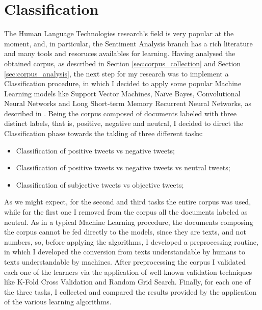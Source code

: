 \documentclass[11pt,twocolumn]{article}
\begin{document}
    \section{Classification} %
    \label{sec:classification}
        The Human Language Technologies research's field is very popular at the moment, and, in particular, the
        Sentiment Analysis branch has a rich literature and many tools and resoruces availables for learning.
        Having analysed the obtained corpus, as described in Section \ref{sec:corpus_collection} and Section
        \ref{sec:corpus_analysis}, the next step for my research was to implement a Classification procedure,
        in which I decided to apply some popular Machine Learning models like Support Vector Machines,
        Naïve Bayes, Convolutional Neural Networks and Long Short-term Memory Recurrent Neural Networks, as
        described in \cite{semeval_2014,state_of_the_art,semeval_2016,esuli,attardi}. Being the corpus composed
        of documents labeled with three distinct labels, that is, positive, negative and neutral, I decided to
        direct the Classification phase towards the takling of three different tasks:

        \begin{itemize}
            \item Classification of positive tweets vs negative tweets;
            \item Classification of positive tweets vs negative tweets vs neutral tweets;
            \item Classification of subjective tweets vs objective tweets;
        \end{itemize}

        \noindent
        As we might expect, for the second and third tasks the entire corpus was used, while for the first one
        I removed from the corpus all the documents labeled as neutral. As in a typical Machine Learning
        procedure, the documents composing the corpus cannot be fed directly to the models, since they are
        texts, and not numbers, so, before applying the algorithms, I developed a preprocessing routine, in
        which I developed the conversion from texts understandable by humans to texts understandable by
        machines. After preprocessing the corpus I validated each one of the learners via the application of
        well-known validation techniques like K-Fold Cross Validation and Random Grid Search. Finally, for each
        one of the three tasks, I collected and compared the results provided by the application of the
        various learning algorithms.
\end{document}
